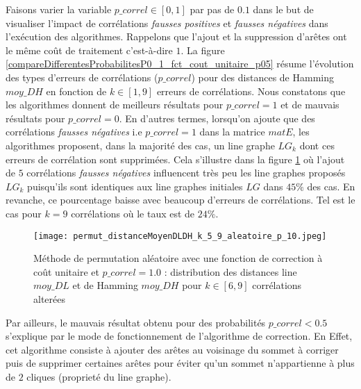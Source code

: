 Faisons varier la variable $p\_correl \in [0,1]$ par pas de $0.1$ dans le but de visualiser l'impact de corr\'elations {\em fausses positives} et {\em fausses n\'egatives} dans l'ex\'ecution des algorithmes. Rappelons que l'ajout et la suppression d'ar\^etes ont le m\^eme co\^ut de traitement c'est-\`a-dire $1$.
La figure \ref{compareDifferentesProbabilitesP0_1_fct_cout_unitaire_p05} r\'esume l'\'evolution des types d'erreurs de corr\'elations ($p\_correl$) pour des distances de Hamming $moy\_DH$ en fonction de  $k \in [1, 9]$  erreurs de corr\'elations.
\newline 
Nous constatons que les algorithmes donnent de meilleurs r\'esultats pour $p\_correl = 1$ et de mauvais r\'esultats pour $p\_correl = 0$. 
En d'autres termes, lorsqu'on ajoute que des corr\'elations {\em fausses n\'egatives} i.e $p\_correl  = 1$ dans la matrice $matE$, les algorithmes  proposent, dans la majorit\'e des cas, un line graphe $LG_k$ dont ces erreurs de corr\'elation sont supprim\'ees. Cela s'illustre dans la figure \ref{permut_distanceMoyenDLDH_k_5_9_aleatoire_p_10} o\`u l'ajout de $5$ corr\'elations {\em fausses n\'egatives} influencent tr\`es peu les line graphes propos\'es $LG_{k}$ puisqu'ils sont identiques aux line graphes initiales $LG$ dans $45\%$ des cas. 
En revanche, ce pourcentage baisse avec beaucoup d'erreurs de corr\'elations. Tel est le cas pour $k = 9$ corr\'elations o\`u le taux est de $24\%$. 
\begin{figure}[htb!] 
\centering
\texttt{[image: permut\_distanceMoyenDLDH\_k\_5\_9\_aleatoire\_p\_10.jpeg]}
\caption{ M\'ethode de permutation al\'eatoire avec une fonction de correction \`a co\^ut unitaire et $p\_correl = 1.0$ : distribution des distances line $moy\_DL$ et de Hamming $moy\_DH$ pour $k \in [6,  9]$ corr\'elations alter\'ees}
\label{permut_distanceMoyenDLDH_k_5_9_aleatoire_p_10} 
\end{figure}
\newline
Par ailleurs, le mauvais r\'esultat obtenu pour des probabilit\'es $p\_correl < 0.5$ s'explique par le mode de fonctionnement de l'algorithme de correction. En Effet, cet algorithme consiste \`a ajouter des ar\^etes au voisinage du sommet \`a corriger puis de supprimer certaines ar\^etes pour \'eviter qu'un sommet n'appartienne \`a plus de $2$ cliques (propriet\'e du line graphe).
\newline

